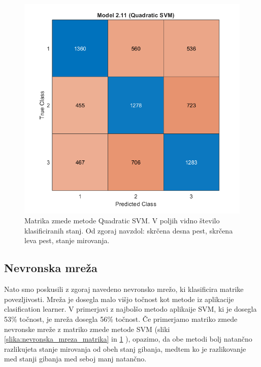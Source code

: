 \begin{figure}
    \begin{center}
    \includegraphics[width=0.8\linewidth]{slike/ConfusionSVM.png}
    \end{center}
    \caption{Matrika zmede metode Quadratic SVM. V poljih vidno število klasificiranih stanj. Od zgoraj navzdol: skrčena desna pest, skrčena leva pest, stanje mirovanja.}
    \label{slika:SVM_matrika}
    \end{figure}

\subsection{Nevronska mreža}
Nato smo poskusili z zgoraj navedeno nevronsko mrežo, ki klasificira matrike povezljivosti. Mreža je dosegla malo višjo točnost kot metode iz aplikacije clasification learner. V primerjavi z najbolšo metodo aplikaije SVM, ki je dosegla 53\% točnost, je mreža dosegla 56\% točnost. Če primerjamo matriko zmede nevronske mreže z matriko zmede metode SVM (sliki \ref{slika:nevronska_mreza_matrika} in \ref{slika:SVM_matrika} ), opazimo, da obe metodi bolj natančno razlikujeta stanje mirovanja od obeh stanj gibanja, medtem ko je razlikovanje med stanji gibanja med seboj manj natančno.

